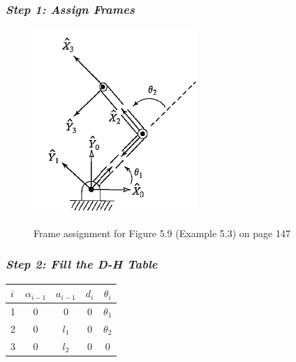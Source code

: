 \documentclass[10pt]{article}
\begin{document}
\subsubsection*{\textit{\textbf{Step 1: Assign Frames}}}
\begin{figure}[!h]
\centering
\includegraphics[]{Fig59}
\it{\caption{Frame assignment for Figure 5.9 (Example 5.3) on page 147\cite{textbook}}}
\end{figure}
\subsubsection*{\textit{\textbf{Step 2: Fill the D-H Table}}}
\begin{center}
\begin{tabular}{ l | c c c c }
  $i$ & $\alpha_{i-1}$ & $a_{i-1}$ & $d_{i}$ & $\theta_{i}$ \\
  \hline
  1   & $0$            & $0$       & $0$     & $\theta_{1}$\\ 
  2   & $0$    		   & $l_{1}$   & $0$     & $\theta_{2}$\\
  3   & $0$    		   & $l_{2}$   & $0$     & $0$
\end{tabular}
\end{center}
\end{document}
